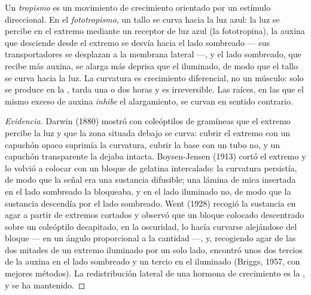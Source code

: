 \begin{proposition}[El fototropismo]\label{prop:b2:plant-plasticity:phototropism}
Un \emph{tropismo} es un movimiento de crecimiento orientado por un
estímulo direccional. En el \emph{fototropismo}, un tallo se curva hacia
la luz azul: la luz se percibe en el extremo mediante un receptor de luz
azul (la fototropina), la auxina que desciende desde el extremo se desvía
hacia el lado sombreado --- sus transportadores se desplazan a la membrana
lateral ---, y el lado sombreado, que recibe más auxina, se alarga más
deprisa que el iluminado, de modo que el tallo se curva hacia la luz. La
curvatura es crecimiento diferencial, no un músculo: solo se produce en la
, tarda una o dos horas y es irreversible. Las raíces,
en las que el mismo exceso de auxina \emph{inhibe} el alargamiento, se
curvan en sentido contrario.
\end{proposition}
\begin{proof}[Evidencia]
Darwin (1880) mostró con coleóptilos de gramíneas que el extremo percibe la
luz y que la zona situada debajo se curva: cubrir el extremo con un
capuchón opaco suprimía la curvatura, cubrir la base con un tubo no, y un
capuchón transparente la dejaba intacta. Boysen-Jensen (1913) cortó el
extremo y lo volvió a colocar con un bloque de gelatina intercalado: la
curvatura persistía, de modo que la señal era una sustancia difusible;
una lámina de mica insertada en el lado sombreado la bloqueaba, y en el
lado iluminado no, de modo que la sustancia descendía por el lado
sombreado. Went (1928) recogió la sustancia en agar a partir de extremos
cortados y observó que un bloque colocado descentrado sobre un coleóptilo
decapitado, en la oscuridad, lo hacía curvarse alejándose del bloque ---
en un ángulo proporcional a la cantidad ---, y, recogiendo agar de las dos
mitades de un extremo iluminado por un solo lado, encontró unos dos
tercios de la auxina en el lado sombreado y un tercio en el iluminado
(Briggs, 1957, con mejores métodos). La redistribución lateral de una
hormona de crecimiento es la , y se ha
mantenido.
\end{proof}

